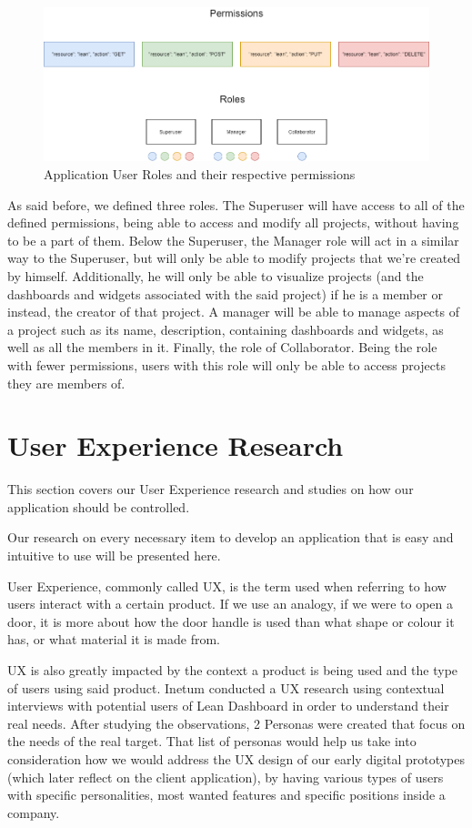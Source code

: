 \documentclass[a4paper,twoside,10pt]{report}
\begin{document}
\begin{figure}[h!]
\center
    \includegraphics[width=\textwidth]{lean-rbac-model.png}
\caption{Application User Roles and their respective permissions}
\end{figure}
As said before, we defined three roles. The Superuser will have access to all of the defined permissions, being able to access and modify all projects,  without having to be a part of them. 
Below the Superuser, the Manager role will act in a similar way to the Superuser, but will only be able to modify projects that we're created by himself. Additionally, he will only be able to visualize projects (and the dashboards and widgets associated with the said project) if he is a member or instead, the creator of that project. A manager will be able to manage aspects of a project such as its name, description, containing dashboards and widgets, as well as all the members in it.
Finally, the role of Collaborator. Being the role with fewer permissions, users with this role will only be able to access projects they are members of.

\chapter{User Experience Research}
This section covers our User Experience research and studies on how our application should be controlled.

Our research on every necessary item to develop an application that is easy and intuitive to use will be presented here.

User Experience, commonly called UX, is the term used when referring to how users interact with a certain product. If we use an analogy, if we were to open a door, it is more about how the door handle is used than what shape or colour it has, or what material it is made from. 

UX is also greatly impacted by the context a product is being used and the type of users using said product. Inetum conducted a UX research using contextual interviews with potential users of Lean Dashboard in order to understand their real needs. After studying the observations, 2 Personas were created that focus on the needs of the real target. That list of personas would help us take into consideration how we would address the UX design of our early digital prototypes (which later reflect on the client application), by having various types of users with specific personalities, most wanted features and specific positions inside a company. 
\end{document}
